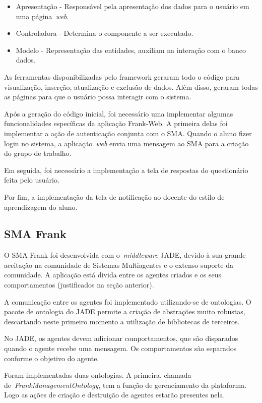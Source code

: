 \begin{itemize}
	\item Apresentação - Responsável pela apresentação dos dados para o usuário em uma página~\emph{web}.
	\item Controladora - Determina o componente a ser executado.
	\item Modelo - Representação das entidades, auxiliam na interação com o banco dados.
\end{itemize}

As ferramentas disponibilizadas pelo framework geraram todo o código para visualização, inserção, atualização e exclusão de dados. Além disso, geraram todas as páginas para que o usuário possa interagir com o sistema. 

Após a geração do código inicial, foi necessário uma implementar algumas funcionalidades específicas da aplicação Frank-Web. A primeira delas foi implementar a ação de autenticação conjunta com o SMA. Quando o aluno fizer login no sistema, a aplicação~\emph{web} envia uma mensagem ao SMA para a criação do grupo de trabalho.

Em seguida, foi necessário a implementação a tela de respostas do questionário feita pelo usuário.

Por fim, a implementação da tela de notificação ao docente do estilo de aprendizagem do aluno.

\subsection{SMA Frank}

O SMA Frank foi desenvolvida com o~\emph{middleware} JADE, devido à sua grande aceitação na comunidade de Sistemas Multiagentes e o extenso suporte da comunidade. A aplicação está divida entre os agentes criados e os seus comportamentos (justificados na seção anterior).

A comunicação entre os agentes foi implementado utilizando-se de ontologias. O pacote de ontologia do JADE permite a criação de abstrações muito robustas, descartando neste primeiro momento a utilização de bibliotecas de terceiros.

No JADE, os agentes devem adicionar comportamentos, que são disparados quando o agente recebe uma mensagem. Os comportamentos são separados conforme o objetivo do agente.

Foram implementadas duas ontologias. A primeira, chamada de~\emph{FrankManagementOntology}, tem a função de gerenciamento da plataforma. Logo as ações de criação e destruição de agentes estarão presentes nela.

